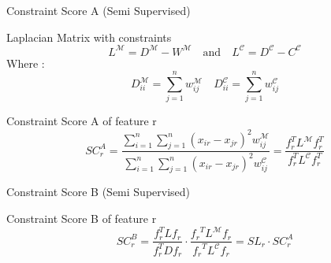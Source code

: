 \documentclass{beamer}
\begin{document}
\begin{frame}{Constraint Score A (Semi Supervised)}
    \begin{block}{Laplacian Matrix with constraints}
        \[
L^{\mathcal{M}} = D^{\mathcal{M}} - W^{\mathcal{M}} \quad \text{and} \quad L^{\mathcal{C}} = D^{\mathcal{C}} - C^{\mathcal{C}}
\]
Where :
\[
D_{ii}^{\mathcal{M}} = \sum_{j=1}^n w_{ij}^{\mathcal{M}} \quad D_{ii}^{\mathcal{C}} = \sum_{j=1}^n w_{ij}^{\mathcal{C}}
\]

    \end{block}

    \begin{block}{Constraint Score A of feature r}
        \[
SC_{r}^A = \frac{\sum_{i=1}^n \sum_{j=1}^n (x_{ir} - x_{jr})^2 w_{ij}^{\mathcal{M}}}{\sum_{i=1}^n \sum_{j=1}^n (x_{ir} - x_{jr})^2 w_{ij}^{\mathcal{C}}} = \frac{f_{r}^T L^{\mathcal{M}} f_{r}^T}{f_{r}^T L^{\mathcal{C}} f_{r}^T}
\]
    \end{block}
\end{frame}

\begin{frame}{Constraint Score B (Semi Supervised)}
    \begin{block}{Constraint Score B of feature r}
        \[
        SC^B_r = \frac{f_r^{T}Lf_r}{f_r^{T}Df_r} \cdot \frac{{f_r}^{T}L^{\mathcal{M}}f_r}{{f_r}^{T}L^{\mathcal{C}}f_r} = SL_r \cdot SC^A_r
        \]
    \end{block}
\end{frame}
\end{document}
